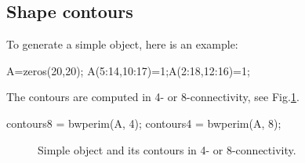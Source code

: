 \def\QRCODE{TB_IPR_TUT.IMG.freeman_matlabqrcode.png}
\def\QRPAGE{http://www.iptutorials.science/tree/master/TB_IPR/TUT.IMG.freeman/matlab}

\subsection{Shape contours}
To generate a simple object, here is an example:
\begin{matlab}
A=zeros(20,20);
A(5:14,10:17)=1;A(2:18,12:16)=1;
\end{matlab}


The contours are computed in 4- or 8-connectivity, see Fig.\ref{fig:freeman:matlab:sampleimage}.
\begin{matlab}
contours8 = bwperim(A, 4);
contours4 = bwperim(A, 8);
\end{matlab}

\begin{figure}[htbp]
 \centering
 
 \hfill
 \hfill
 \caption{Simple object and its contours in 4- or 8-connectivity.}
 \label{fig:freeman:matlab:sampleimage}
\end{figure}

